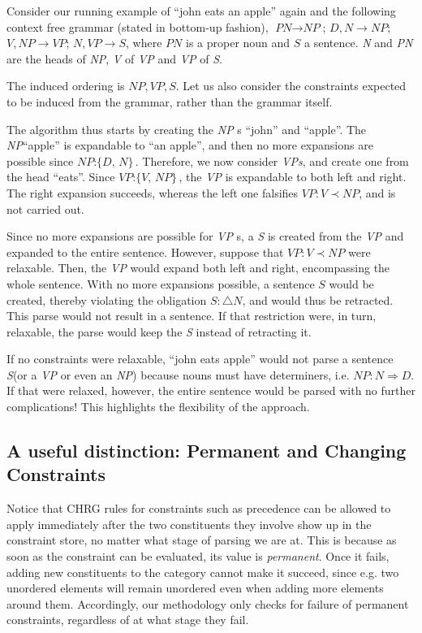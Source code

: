 \documentclass{llncs}
\newcommand{\constituency}[2]{\textit{#1} : \textit{#2}}
\newcommand{\obligation}[2]{\textit{#1} : \triangle \textit{#2}}
\newcommand{\precedence}[3]{\textit{#1} : \textit{#2} \prec \textit{#3}}
\newcommand{\requirement}[3]{\textit{#1} : \textit{#2} \Rightarrow \textit{#3}}
\newcommand{\PN}{\textit{PN}\xspace}
\newcommand{\NP}{\textit{NP}\xspace}
\newcommand{\VP}{\textit{VP}\xspace}
\newcommand{\Se}{\textit{S}\xspace}
\newcommand{\N}{\textit{N}\xspace}
\newcommand{\V}{\textit{V}\xspace}
\begin{document}
\begin{example}
  Consider our running example of ``john eats an apple'' again and the following context free grammar (stated in bottom-up fashion), $\PN \to \NP$; $D, N \to \NP$; $V,\NP \to \VP$; $N, \VP \to S$, where $\PN$ is a proper noun and $S$ a sentence. \N and \PN are the heads of \NP, \V of \VP and \VP of \Se.
  
  The induced ordering is $\NP,\VP,\Se$. Let us also consider the constraints expected to be induced from the grammar, rather than the grammar itself.

The algorithm thus starts by creating the \NP s ``john'' and ``apple''. The \NP ``apple'' is expandable to ``an apple'', and then no more expansions are possible since $\constituency{NP}{\{D, N\}}$. Therefore, we now consider \textit{VPs}, and create one from the head ``eats''. Since $\constituency{VP}{\{V, NP\}}$, the \VP is expandable to both left and right. The right expansion succeeds, whereas the left one falsifies $\precedence{VP}{V}{NP}$, and is not carried out.

Since no more expansions are possible for \VP s, a \Se is created from the \VP and expanded to the entire sentence. However, suppose that $\precedence{VP}{V}{NP}$ were relaxable. Then, the \VP would expand both left and right, encompassing the whole sentence. With no more expansions possible, a sentence $S$ would be created, thereby violating the obligation $\obligation{S}{N}$, and would thus be retracted. This parse would not result in a sentence. If that restriction were, in turn, relaxable, the parse would keep the \Se instead of retracting it.

If no constraints were relaxable, ``john eats apple'' would not parse a sentence \Se (or a \VP or even an \NP) because nouns must have determiners, i.e. $\requirement{NP}{N}{D}$. If that were relaxed, however, the entire sentence would be parsed with no further complications! This highlights the flexibility of the approach.
\end{example}

\subsection{A useful distinction: Permanent and Changing Constraints}


Notice that CHRG rules  for constraints such as precedence can be allowed to apply  immediately after the two constituents they involve show up in the constraint store, no matter what stage of parsing we are at.  This is because as soon as the constraint can be evaluated, its value is \emph{permanent}. Once it fails, adding new constituents to the category cannot make it succeed, since e.g. two unordered elements will remain unordered even when adding more elements around them.  Accordingly, our methodology only checks for failure of permanent constraints, regardless of at what stage they fail.
\end{document}
